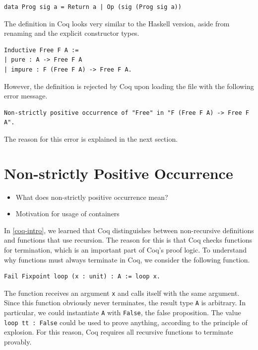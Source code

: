 \documentclass[a4paper, 11pt, fleqn, twoside]{scrreprt}
\begin{document}
\begin{verbatim}
data Prog sig a = Return a | Op (sig (Prog sig a))
\end{verbatim}

The definition in Coq looks very similar to the Haskell version, aside from 
renaming and the explicit constructor types.

\begin{verbatim}
Inductive Free F A :=
| pure : A -> Free F A
| impure : F (Free F A) -> Free F A.
\end{verbatim}

However, the definition is rejected by Coq upon loading the file with the 
following error message.

\begin{verbatim}
Non-strictly positive occurrence of "Free" in "F (Free F A) -> Free F A".
\end{verbatim}

The reason for this error is explained in the next section.

\section{Non-strictly Positive Occurrence}
\begin{itemize}
\item What does non-strictly positive occurrence mean?
\item Motivation for usage of containers
\end{itemize}

In \autoref{coq-intro}, we learned that Coq distinguishes between 
non-recursive definitions and functions that use recursion. The reason for this 
is that Coq checks functions for termination, which is an important part of 
Coq's proof logic. To understand why functions must always terminate in Coq, we 
consider the following function.

\begin{verbatim}
Fail Fixpoint loop (x : unit) : A := loop x.
\end{verbatim}

The function receives an argument \texttt{x} and calls itself with the 
same argument. Since this function obviously never terminates, the result type 
\texttt{A} is arbitrary. In particular, we could instantiate 
\texttt{A} with \texttt{False}, the false proposition. The 
value \texttt{loop tt : False} could be used to prove anything,
according to the principle of explosion. For this reason, Coq requires all 
recursive functions to terminate provably.
\end{document}

